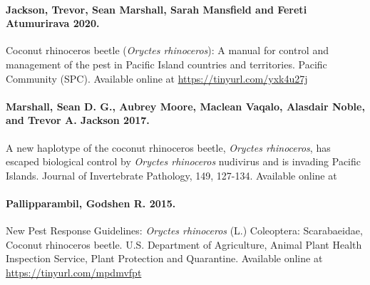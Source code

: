 \documentclass[twocolumn,letterpaper]{scrartcl}
\begin{document}
\paragraph{Jackson, Trevor, Sean Marshall, Sarah Mansfield and Fereti Atumurirava 2020.} Coconut rhinoceros beetle (\textit{Oryctes rhinoceros}): A manual for control and management of the pest in Pacific Island countries and territories. Pacific Community (SPC). 
Available online at \url{https://tinyurl.com/yxk4u27j} 

\paragraph{Marshall, Sean D. G., Aubrey Moore, Maclean Vaqalo, Alasdair Noble, and Trevor A. Jackson 2017.} A new haplotype of the coconut rhinoceros beetle, \textit{Oryctes rhinoceros}, has escaped biological control by \textit{Oryctes rhinoceros} nudivirus and is invading Pacific Islands. Journal of Invertebrate Pathology, 149, 127-134.
Available online at 

\paragraph{Pallipparambil, Godshen R. 2015.} New Pest Response Guidelines: \textit{Oryctes rhinoceros} (L.) Coleoptera: Scarabaeidae, Coconut rhinoceros beetle. U.S. Department of Agriculture, Animal Plant Health Inspection Service, Plant Protection and Quarantine.
Available online at \url{https://tinyurl.com/mpdmvfpt}

%
%
\end{document}
